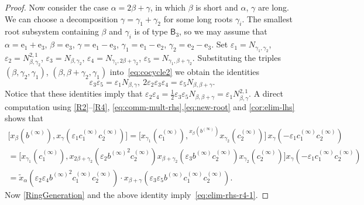 \documentclass[oneside, 11pt]{amsart}
\numberwithin{equation}{section}
\theoremstyle{definition}
\theoremstyle{remark}
\newcommand{\up}[2]{{^{#1}\!{#2}}}
\newcommand{\rB}{\mathsf{B}}
\begin{document}
\begin{proof}
 Now consider the case \(\alpha = 2\beta + \gamma\), in which \(\beta\) is short and \(\alpha\), \(\gamma\) are long. We can choose a decomposition \(\gamma = \gamma_1 + \gamma_2\) for some long roots \(\gamma_i\). The smallest root subsystem containing \(\beta\) and \(\gamma_i\) is of type \(\rB_3\), so we may assume that \(\alpha = \mathrm e_1 + \mathrm e_3\), \(\beta = \mathrm e_3\), \(\gamma = \mathrm e_1 - \mathrm e_3\), \(\gamma_1 = \mathrm e_1 - \mathrm e_2\), \(\gamma_2 = \mathrm e_2 - \mathrm e_3\). Set $\varepsilon_1 = N_{\gamma_1, \gamma_2}$, $\varepsilon_2 = N_{\beta,\gamma_2}^{2,1}$, $\varepsilon_3 = N_{\beta,\gamma_2}$, $\varepsilon_4 = N_{\gamma_1, 2\beta+\gamma_2}$, $\varepsilon_5 = N_{\gamma_1, \beta+\gamma_2}$.
 Substituting the triples $(\beta, \gamma_2, \gamma_1)$, $(\beta, \beta+\gamma_2, \gamma_1)$ into~\eqref{eq:cocycle2} we obtain the identities 
 \begin{equation*}
  \varepsilon_3 \varepsilon_5 = \varepsilon_1 N_{\beta,\gamma},\ 2\varepsilon_2\varepsilon_3 \varepsilon_4 = \varepsilon_5N_{\beta,\beta+\gamma}.
 \end{equation*}
 Notice that these identities imply that $\varepsilon_2\varepsilon_4 = \tfrac{1}{2} \varepsilon_3 \varepsilon_5 N_{\beta,\beta+\gamma} = \varepsilon_1 N_{\beta,\gamma}^{2,1}$.
 A direct computation using \eqref{R2}--\eqref{R4}, \eqref{eq:comm-mult-rhs},\eqref{eq:new-root} and \cref{cor:elim-lhs} shows that
 \begin{align*}
  \bigl[x_\beta(b^{(\infty)}), x_\gamma(\varepsilon_1 c_1^{(\infty)} c_2^{(\infty)})\bigr]
   =  \bigl[x_{\gamma_1}(c_1^{(\infty)}), \up{x_\beta(b^{(\infty)})} {x_{\gamma_2}(c_2^{(\infty)})}\bigr]\,
  x_\gamma(-\varepsilon_1 c_1^{(\infty)} c_2^{(\infty)})  \\  
  = \bigl[x_{\gamma_1}(c_1^{(\infty)}), x_{2\beta+\gamma_2}(\varepsilon_2 {b^{(\infty)}}^2 c_2^{(\infty)}) x_{\beta+\gamma_2}(\varepsilon_3 b^{(\infty)} c_2^{(\infty)}) x_{\gamma_2}(c_2^{(\infty)})\bigr] x_\gamma(-\varepsilon_1 c_1^{(\infty)} c_2^{(\infty)}) \\
  = \widetilde{x}_\alpha( \varepsilon_2 \varepsilon_4 {b^{(\infty)}}^2 c_1^{(\infty)}c_2^{(\infty)}) \cdot x_{\beta+\gamma}(\varepsilon_3 \varepsilon_5 b^{(\infty)} c_1^{(\infty)}c_2^{(\infty)}). \end{align*}
Now \cref{RingGeneration} and the above identity imply~\eqref{eq:elim-rhs-r4-1}. \end{proof}
\end{document}
